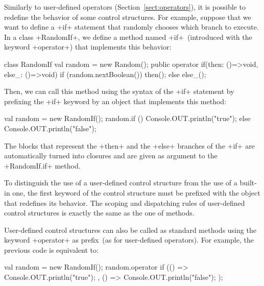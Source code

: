 Similarly to user-defined operators (Section~\ref{sect:operators}), it is possible to redefine the
behavior of some control structures.
%
For example, suppose that we want to define a \xcd+if+ statement that
randomly chooses which branch to execute. In a class \xcd+RandomIf+,
we define a method named \xcd+if+~(introduced with the keyword
\xcd+operator+) that implements this behavior:
\begin{xten}
class RandomIf {
    val random = new Random();
    public operator if(then: ()=>void, else_: ()=>void) {
        if (random.nextBoolean()) {
            then();
        } else {
            else_();
        }
    }
}
\end{xten}
Then, we can call this method using the syntax of the \xcd+if+
statement by prefixing the \xcd+if+ keyword by an object that
implements this method:
\begin{xten}
    val random = new RandomIf();
    random.if () {
        Console.OUT.println("true");
    } else {
        Console.OUT.println("false");
    }
\end{xten}
The blocks that represent the \xcd+then+ and the \xcd+else+ branches
of the \xcd+if+ are automatically turned into closures and are given
as argument to the \xcd+RandomIf.if+ method.

To distinguish the use of a user-defined control structure from the
use of a built-in one, the first keyword of the control structure must
be prefixed with the object that redefines its behavior.
%
The scoping and dispatching rules of user-defined control structures
is exactly the same as the one of methods.


User-defined control structures can also be called as standard methods
using the keyword \xcd+operator+ as prefix~(as for user-defined
operators). For example, the previous code is equivalent to:
\begin{xten}
    val random = new RandomIf();
    random.operator if (() => { Console.OUT.println("true"); },
                        () => { Console.OUT.println("false"); });
\end{xten}

